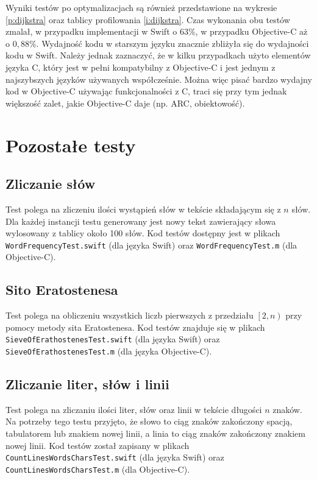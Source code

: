 \documentclass[mgr, shortabstract]{iithesis}
\begin{document}
Wyniki testów po optymalizacjach są również przedstawione na wykresie \ref{p:dijkstra} oraz tablicy profilowania \ref{i:dijkstra}. Czas wykonania obu testów zmalał, w przypadku implementacji w Swift o $63\%$, w przypadku Objective-C aż o $0,88\%$. Wydajność kodu w starszym języku znacznie zbliżyła się do wydajności kodu w Swift. Należy jednak zaznaczyć, że w kilku przypadkach użyto elementów języka C, który jest w pełni kompatybilny z Objective-C i jest jednym z najszybszych języków używanych współcześnie. Można więc pisać bardzo wydajny kod w Objective-C używając funkcjonalności z C, traci się przy tym jednak większość zalet, jakie Objective-C daje (np. ARC, obiektowość).

\section{Pozostałe testy}

\subsection{Zliczanie słów}

Test polega na zliczeniu ilości wystąpień słów w tekście składającym się z $n$ słów. Dla każdej instancji testu generowany jest nowy tekst zawierający słowa wylosowany z tablicy około 100 słów. Kod testów dostępny jest w plikach \texttt{WordFrequencyTest.swift} (dla języka Swift) oraz \texttt{WordFrequencyTest.m} (dla Objective-C).

\subsection{Sito Eratostenesa}

Test polega na obliczeniu wszystkich liczb pierwszych z przedziału $\left[2, n\right)$ przy pomocy metody sita Eratostenesa. Kod testów znajduje się w plikach \texttt{SieveOfErathostenesTest.swift} (dla języka Swift) oraz \texttt{SieveOfErathostenesTest.m} (dla języka Objective-C).

\subsection{Zliczanie liter, słów i linii}

Test polega na zliczaniu ilości liter, słów oraz linii w tekście długości $n$ znaków. Na potrzeby tego testu przyjęto, że słowo to ciąg znaków zakończony spacją, tabulatorem lub znakiem nowej linii, a linia to ciąg znaków zakończony znakiem nowej linii. Kod testów został zapisany w plikach \texttt{CountLinesWordsCharsTest.swift} (dla języka Swift) oraz \texttt{CountLinesWordsCharsTest.m} (dla Objective-C).
\end{document}
